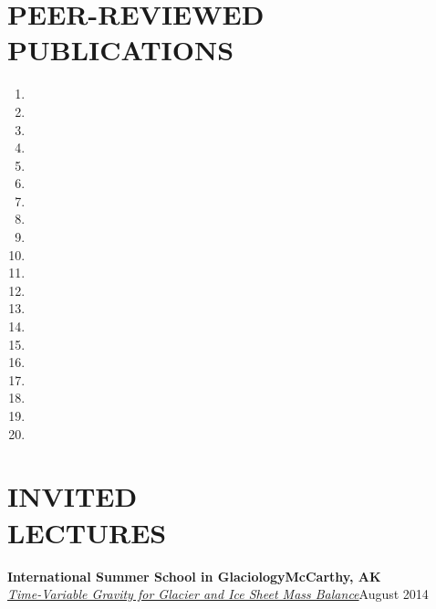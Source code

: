 \documentclass[margin,line,11pt]{res}
\begin{document}
\begin{resume}
\section{PEER-REVIEWED\\ PUBLICATIONS}
	\begin{enumerate}
		\setlength{\itemindent}{-3ex}
		\item {}
		\item {}
		\item {}
		\item {}
		\item {}
		\item {}
		\item {}
		\item {}
		\item {}
		\item {}
		\item {}
		\item {}
		\item {}
		\item {}
		\item {}
		\item {}
		\item {}
		\item {}
		\item {}
		\item {}
	\end{enumerate}

\section{INVITED\\ LECTURES}
	{\bf International Summer School in Glaciology}\hfill {\bf McCarthy, AK}\\
	{\em \href{http://glaciers.gi.alaska.edu/sites/default/files/Lecture_GRACE_Sutterley2014.pdf}{Time-Variable Gravity for Glacier and Ice Sheet Mass Balance}}\hfill August 2014


\end{resume}
\end{document}
